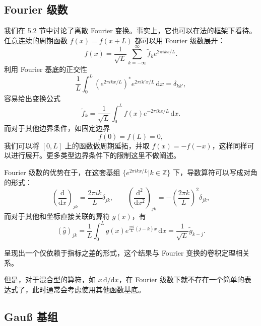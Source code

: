 \subsection{Fourier 级数}

我们在 5.2 节中讨论了离散 Fourier 变换。事实上，它也可以在法的框架下看待。任意连续的周期函数 $f(x)=f(x+L)$ 都可以用 Fourier 级数展开：
\begin{equation}
f(x)=\frac1{\sqrt L}\sum_{k=-\infty}^{\infty}\tilde f_k e^{2\pi i kx/L}.
\tag{5.4.31}
\end{equation}
利用 Fourier 基底的正交性
\begin{equation}
\frac1L\int_0^L\left(e^{2\pi i kx/L}\right)^*e^{2\pi i k'x/L}\,\mathrm dx=\delta_{kk'},
\tag{5.4.32}
\end{equation}
容易给出变换公式
\begin{equation}
\tilde f_k=\frac1{\sqrt L}\int_0^L f(x)e^{-2\pi i kx/L}\,\mathrm dx.
\tag{5.4.33}
\end{equation}
而对于其他边界条件，如固定边界
\begin{equation}
f(0)=f(L)=0,
\tag{5.4.34}
\end{equation}
我们可以将 $[0,L]$ 上的函数做周期延拓，并取 $f(x)=-f(-x)$，这样同样可以进行展开。更多类型边界条件下的限制这里不做阐述。

Fourier 级数的优势在于，在这套基组 $\{e^{2\pi ikx/L}|k\in\mathbb Z\}$ 下，导数算符可以写成对角的形式：
\begin{equation}
\left(\frac{\mathrm d}{\mathrm dx}\right)_{jk}=\frac{2\pi ik}{L}\delta_{jk},\qquad
\left(\frac{\mathrm d^2}{\mathrm dx^2}\right)_{jk}=-\left(\frac{2\pi k}{L}\right)^2\delta_{jk},
\tag{5.4.35}
\end{equation}
而对于其他和坐标直接关联的算符 $g(x)$，有
\begin{equation}
(\hat g)_{jk}=\frac1L\int_0^L g(x)e^{\frac{2\pi i}{L}(j-k)x}\,\mathrm dx
=\frac1{\sqrt L}\tilde g_{k-j}.
\tag{5.4.36}
\end{equation}

呈现出一个仅依赖于指标之差的形式，这个结果与 Fourier 变换的卷积定理相关系。

但是，对于混合型的算符，如 $x\,\mathrm d/\mathrm dx$，在 Fourier 级数下就不存在一个简单的表达式了，此时通常会考虑使用其他函数基底。

\subsection{Gauß 基组}

